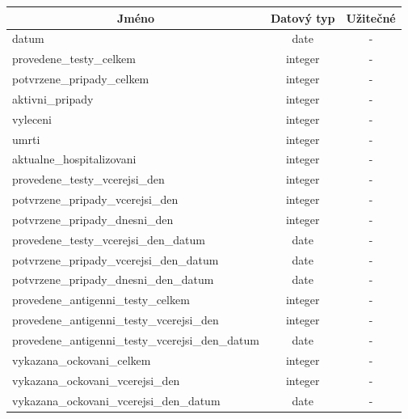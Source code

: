 \documentclass[12pt]{article}
\begin{document}
        \begin{center}
            \begin{tabular}{ |l|c|c| } 
                \hline
                \multicolumn{1}{|c|}{Jméno} & Datový typ & Užitečné \\
                \hline
                \hline
                datum & date & - \\ 
                \hline
                provedene\_testy\_celkem & integer & - \\ 
                \hline
                potvrzene\_pripady\_celkem & integer & - \\ 
                \hline
                aktivni\_pripady & integer & - \\ 
                \hline
                vyleceni & integer & - \\ 
                \hline
                umrti & integer & - \\ 
                \hline
                aktualne\_hospitalizovani & integer & - \\ 
                \hline
                provedene\_testy\_vcerejsi\_den & integer & - \\ 
                \hline
                potvrzene\_pripady\_vcerejsi\_den & integer & - \\ 
                \hline
                potvrzene\_pripady\_dnesni\_den & integer & - \\ 
                \hline
                provedene\_testy\_vcerejsi\_den\_datum & date & - \\ 
                \hline
                potvrzene\_pripady\_vcerejsi\_den\_datum & date & - \\ 
                \hline
                potvrzene\_pripady\_dnesni\_den\_datum & date & - \\ 
                \hline
                provedene\_antigenni\_testy\_celkem & integer & - \\ 
                \hline
                provedene\_antigenni\_testy\_vcerejsi\_den & integer & - \\ 
                \hline
                provedene\_antigenni\_testy\_vcerejsi\_den\_datum & date & - \\ 
                \hline
                vykazana\_ockovani\_celkem & integer & - \\ 
                \hline
                vykazana\_ockovani\_vcerejsi\_den & integer & - \\ 
                \hline
                vykazana\_ockovani\_vcerejsi\_den\_datum & date & - \\ 

\end{tabular}
\end{center}
\end{document}
